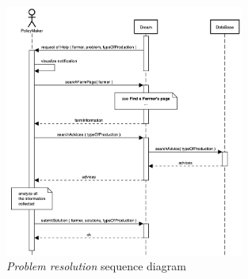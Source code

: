 \begin{enumerate}
    \begin{figure}[H]
        \begin{center}
        \includegraphics[width=0.7\textwidth]{sequence/replyHelp.png}
        \caption{\emph{Problem resolution} sequence diagram}
        \label{fig:sequence14}
        \end{center}
    \end{figure}
\end{enumerate}

